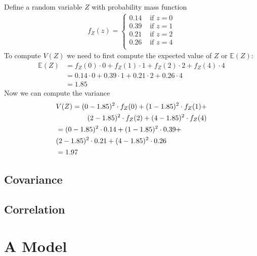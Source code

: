 \ex Define a random variable $Z$ with probability mass function 
\begin{align}
    f_{Z}(z) = \begin{cases}
                  0.14 & \text{ if } z=0\\
                  0.39 & \text{ if } z=1\\
                  0.21 & \text{ if } z=2\\
                  0.26 & \text{ if } z=4\\
               \end{cases}
\end{align}
To compute $V(Z)$ we need to first compute the expected value of $Z$ or $\mathbb{E}(Z)$: 
\begin{align}
    \mathbb{E}(Z) &= f_{Z}(0) \cdot 0 + f_{Z}(1) \cdot 1 + f_{Z}(2) \cdot 2 + f_{Z}(4) \cdot 4\\
                  &= 0.14 \cdot 0 + 0.39 \cdot 1 + 0.21 \cdot 2 + 0.26 \cdot 4\\
                  &= 1.85 
\end{align}
Now we can compute the variance
\begin{align}
    &\begin{aligned}
        V(Z) = (0-1.85)^{2} \cdot f_{Z}(0) + (1-1.85)^{2} \cdot f_{Z}(1) +\\
          (2-1.85)^{2} \cdot f_{Z}(2) + (4-1.85)^{2} \cdot f_{Z}(4)
    \end{aligned}\vspace{3mm}\\ 
    &\begin{aligned}
        &=(0-1.85)^{2} \cdot 0.14 + (1-1.85)^{2} \cdot 0.39 +\\
        &(2-1.85)^{2} \cdot 0.21 + (4-1.85)^{2} \cdot 0.26
    \end{aligned}  \vspace{3mm}\\ 
    &= 1.97
\end{align}

\subsection{Covariance}

\subsection{Correlation}



\section{A Model}

